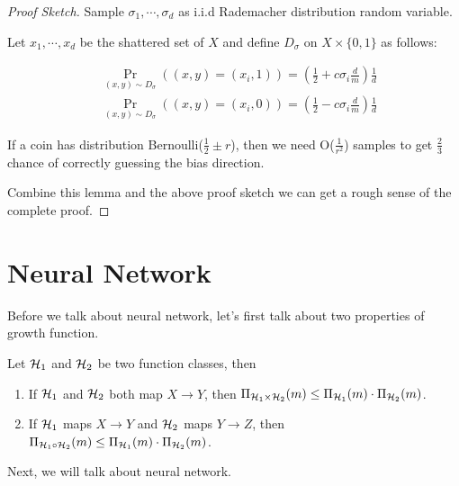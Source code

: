 \documentclass[../main.tex]{subfiles}
\begin{document}
		 \begin{proof}[Proof Sketch]
			Sample $\sigma_1, \cdots , \sigma_d$ as i.i.d Rademacher distribution random variable.
		 		
		 		Let $x_1, \cdots, x_d$ be the shattered set of $X$ and define $D_\sigma$ on $X \times \{0,1\}$ as follows:
		 		
 		\begin{equation}
 		\begin{aligned}
 	&\Pr\limits_{(x,y) \sim D_\sigma} ((x,y) = (x_i, 1)) = (\frac{1}{2} + c\sigma_i \frac{d}{m}) \frac{1}{d} \\
 	&\Pr\limits_{(x,y) \sim D_\sigma} ((x,y) = (x_i, 0)) = (\frac{1}{2} - c\sigma_i \frac{d}{m}) \frac{1}{d} 
 		\end{aligned}
 		\end{equation} 
 		
 		\begin{lemma}
 				If a coin has distribution Bernoulli($\frac{1}{2} \pm r $), then we need O($\frac{1}{r^2}$) samples to get $\frac{2}{3}$ chance of correctly guessing the bias direction.
 			\end{lemma}
 		
 			Combine this lemma and the above proof sketch we can get a rough sense of the complete proof.
		 \end{proof}
		 
		 
		 \section{Neural Network}
		 
		 Before we talk about neural network, let's first talk about two properties of growth function.
		 
		 \begin{fact}\label{Growthfunctionfact}
		 	Let $\mathcal{H}_1$ and $\mathcal{H}_2$ be two function classes, then
		 	
		 	\begin{enumerate}
		 		\item If $\mathcal{H}_1$ and $\mathcal{H}_2$ both map $X\to Y$, then $\Pi_{\mathcal{H}_1 \times \mathcal{H}_2}(m) \leq \Pi_{\mathcal{H}_1}(m) \cdot \Pi_{\mathcal{H}_2}(m) $.
		 		\item If $\mathcal{H}_1$ maps $X\to Y$ and $\mathcal{H}_2$ maps $Y\to Z$, then  $\Pi_{\mathcal{H}_1 \circ \mathcal{H}_2}(m) \leq \Pi_{\mathcal{H}_1}(m) \cdot \Pi_{\mathcal{H}_2}(m) $.
		 	\end{enumerate}
		 \end{fact}
	 
	 Next, we will talk about neural network.
	 
\end{document}
